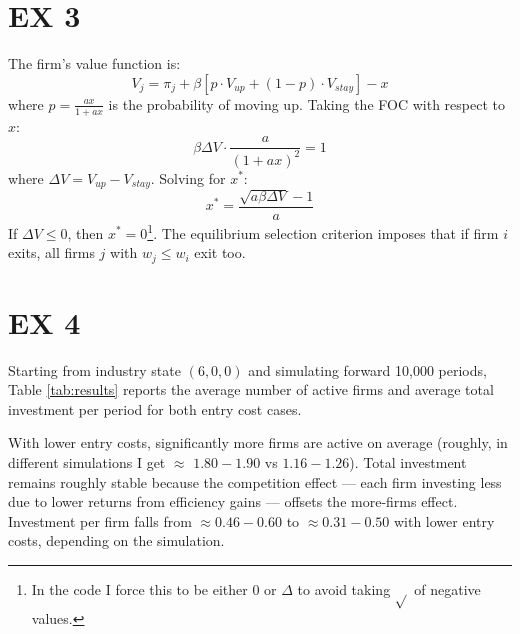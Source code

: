 \documentclass{article}
\begin{document}
\section*{EX 3}

The firm's value function is:
$$V_j = \pi_j + \beta \left[ p \cdot V_{up} + (1-p) \cdot V_{stay} \right] - x$$
where $p = \frac{ax}{1+ax}$ is the probability of moving up. Taking the FOC with respect to $x$:
$$\beta \Delta V \cdot \frac{a}{(1+ax)^2} = 1$$
where $\Delta V = V_{up} - V_{stay}$. Solving for $x^*$:
$$\boxed{x^* = \frac{\sqrt{a \beta \Delta V} - 1}{a}}$$
If $\Delta V \leq 0$, then $x^* = 0$\footnote{In the code I force this to be either 0 or $\Delta$ to avoid taking $\sqrt{}$ of negative values.}. The equilibrium selection criterion imposes that if firm $i$ exits, all firms $j$ with $w_j \leq w_i$ exit too.

\section*{EX 4}

Starting from industry state $(6,0,0)$ and simulating forward 10,000 periods, Table \ref{tab:results} reports the average number of active firms and average total investment per period for both entry cost cases.



With lower entry costs, significantly more firms are active on average (roughly, in different simulations I get $\approx$ $1.80-1.90$ vs $1.16-1.26$). Total investment remains roughly stable because the competition effect — each firm investing less due to lower returns from efficiency gains — offsets the more-firms effect. Investment per firm falls from $\approx 0.46-0.60$ to $\approx 0.31-0.50$ with lower entry costs, depending on the simulation.
\end{document}
